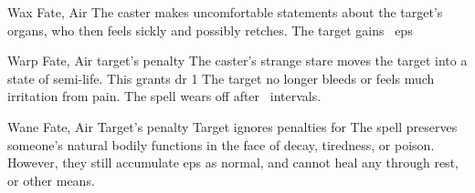 \ifodd\value{diceNo}
  {}%
  {Wax}%
  {Fate, Air}%
  {}%
  {The caster makes uncomfortable statements about the target's organs, who then feels sickly and possibly retches.
  The target gains ~\glspl{ep}}%
  {}

\else

  {}%
  {Warp}%
  {Fate, Air}%
  {target's  penalty}%
  {The caster's strange stare moves the target into a state of semi-life.
  This grants \gls{dr} 1}%
  {
    The target no longer bleeds or feels much irritation from pain.
    The spell wears off after ~\glspl{interval}.}

  {}%
  {Wane}%
  {Fate, Air}%
  {Target's  penalty}%
  {Target ignores   penalties for }%
  {The spell preserves someone's natural bodily functions in the face of decay, tiredness, or poison.
    However, they still accumulate \glspl{ep} as normal, and cannot heal any through rest, or other means.}

\fi
{}
